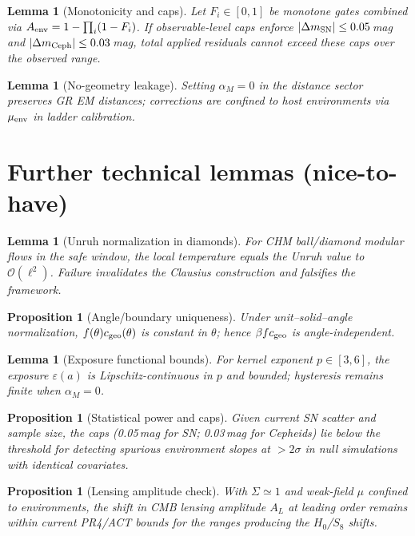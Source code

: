 \documentclass[aps,prd,preprint,onecolumn,longbibliography,nofootinbib]{revtex4-2}
\theoremstyle{plain}
\newtheorem{proposition}[theorem]{Proposition}
\newtheorem{lemma}[theorem]{Lemma}
\theoremstyle{remark}
\newcommand{\Hzero}{H_0}
\newcommand{\alM}{\alpha_{\!M}}
\newcommand{\be}{\beta}
\newcommand{\order}[1]{\mathcal{O}\!\left(#1\right)}
\newcommand{\Sig}{\Sigma} %
\newcommand{\eps}{\varepsilon}
\begin{document}
\begin{lemma}[Monotonicity and caps]\label{lem:gates-caps}
Let $F_i\in[0,1]$ be monotone gates combined via $A_{\rm env}=1-\prod_i(1-F_i)$. If observable-level caps enforce $|\Delta m_{\rm SN}|\le 0.05$\,mag and $|\Delta m_{\rm Ceph}|\le 0.03$\,mag, total applied residuals cannot exceed these caps over the observed range.
\end{lemma}

\begin{lemma}[No-geometry leakage]\label{lem:no-geometry}
Setting $\alM=0$ in the distance sector preserves GR EM distances; corrections are confined to host environments via $\mu_{\rm env}$ in ladder calibration.
\end{lemma}

\section{Further technical lemmas (nice-to-have)}
\begin{lemma}[Unruh normalization in diamonds]\label{lem:unruh}
For CHM ball/diamond modular flows in the safe window, the local temperature equals the Unruh value to $\order{\ell^2}$. Failure invalidates the Clausius construction and falsifies the framework.
\end{lemma}

\begin{proposition}[Angle/boundary uniqueness]\label{prop:angle-uniqueness}
Under unit–solid–angle normalization, $f(\theta)c_{\rm geo}(\theta)$ is constant in $\theta$; hence $\be f c_{\rm geo}$ is angle-independent.
\end{proposition}

\begin{lemma}[Exposure functional bounds]\label{lem:exposure}
For kernel exponent $p\in[3,6]$, the exposure $\eps(a)$ is Lipschitz-continuous in $p$ and bounded; hysteresis remains finite when $\alM=0$.
\end{lemma}

\begin{proposition}[Statistical power and caps]\label{prop:power}
Given current SN scatter and sample size, the caps (0.05\,mag for SN; 0.03\,mag for Cepheids) lie below the threshold for detecting spurious environment slopes at $>2\sigma$ in null simulations with identical covariates.
\end{proposition}

\begin{proposition}[Lensing amplitude check]\label{prop:AL}
With $\Sig\simeq 1$ and weak-field $\mu$ confined to environments, the shift in CMB lensing amplitude $A_L$ at leading order remains within current PR4/ACT bounds for the ranges producing the $\Hzero$/$S_8$ shifts.
\end{proposition}
\end{document}
